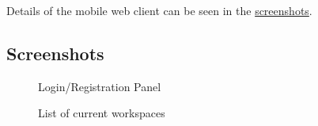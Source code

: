 Details of the mobile web client can be seen in the \hyperref[fig:mobile]{screenshots}.

\newpage

\subsection{Screenshots}

\begin{figure}[ht]
    \centering
    \caption{Login/Registration Panel}
    \label{fig:login}
\end{figure}

\begin{figure}[!ht]
    \centering
    \caption{List of current workspaces}
    \label{fig:workspaces-list}
\end{figure}

